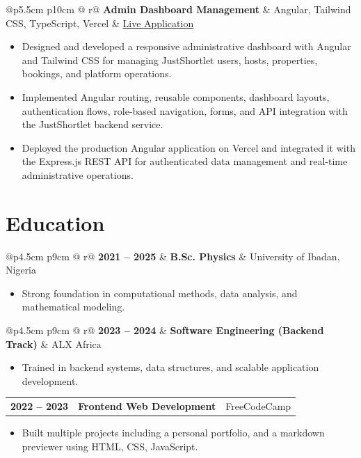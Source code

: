 \documentclass{article}
\makeatletter
\newcommand{\contactinfo}[1]{{\fontsize{11pt}{13pt}\selectfont\color{black!70}#1}}
\newcommand{\cventry}[3]{%
    \noindent
    \begin{tabular*}{\linewidth}{@{}p{4.5cm} p{9cm} @{\extracolsep{\fill}} r@{}}
        \textbf{\small #1} & \textbf{#2} & {\color{primarycolor}\small #3}
    \end{tabular*}
}
\newcommand{\project}[3]{%
    \noindent
    \begin{tabular*}{\linewidth}{@{}p{5.5cm} p{10cm} @{\extracolsep{\fill}} r@{}}
        \textbf{#1} & {#2} & {\color{linkcolor}\small #3}
    \end{tabular*}
}
\makeatother
\begin{document}
\vspace{0.1cm}

\project{{Admin Dashboard Management}}{ Angular, Tailwind CSS, TypeScript, Vercel }{\contactinfo{ \href{https://admin.justshortlet.com}{Live Application}}}
\vspace{-0.4cm}
\begin{itemize}
\item Designed and developed a responsive administrative dashboard with Angular and Tailwind CSS for managing JustShortlet users, hosts, properties, bookings, and platform operations.
\item Implemented Angular routing, reusable components, dashboard layouts, authentication flows, role-based navigation, forms, and API integration with the JustShortlet backend service.
\item Deployed the production Angular application on Vercel and integrated it with the Express.js REST API for authenticated data management and real-time administrative operations.
\end{itemize}

\vspace{0.6cm}

\section{Education}
\cventry{2021 -- 2025}{B.Sc. Physics}{University of Ibadan, Nigeria}
\begin{itemize}
    \item Strong foundation in computational methods, data analysis, and mathematical modeling.
\end{itemize}
 
\cventry{2023 -- 2024}{Software Engineering (Backend Track)}{ALX Africa}
\begin{itemize}
    \item Trained in backend systems, data structures, and scalable application development.
\end{itemize}
 
\cventry{2022 -- 2023}{Frontend Web Development}{FreeCodeCamp}
\begin{itemize}
    \item Built multiple projects including a personal portfolio, and a markdown previewer using HTML, CSS, JavaScript.
\end{itemize}
\end{document}
